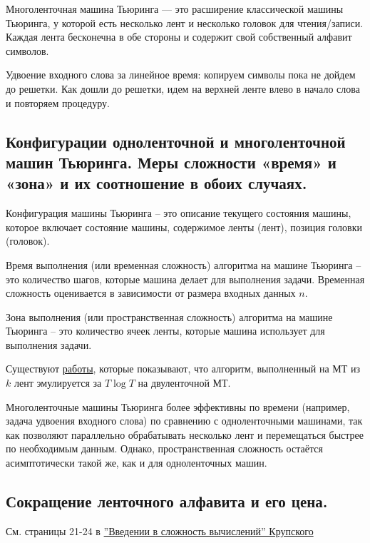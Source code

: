 \documentclass[a4paper, 10pt]{article}
\begin{document}
Многоленточная машина Тьюринга — это расширение классической машины Тьюринга, у которой есть несколько лент и несколько головок для чтения/записи. Каждая лента бесконечна в обе стороны и содержит свой собственный алфавит символов.

Удвоение входного слова за линейное время: копируем символы пока не дойдем до решетки. Как дошли до решетки, идем на верхней ленте влево в начало слова и повторяем процедуру.

\subsection{Конфигурации одноленточной и многоленточной машин Тьюринга. Меры сложности «время» и «зона» и их соотношение в обоих случаях.}

Конфигурация машины Тьюринга -- это описание текущего состояния машины, которое включает состояние машины, содержимое ленты (лент), позиция головки (головок).

Время выполнения (или временная сложность) алгоритма на машине Тьюринга -- это количество шагов, которые машина делает для выполнения задачи. Временная сложность оценивается в зависимости от размера входных данных $n$.

Зона выполнения (или пространственная сложность) алгоритма на машине Тьюринга -- это количество ячеек ленты, которые машина использует для выполнения задачи.

\hfill

Существуют \href{https://www.cs.bu.edu/faculty/gacs/courses/cs535/papers/HennieStearns66.pdf}{работы}, которые показывают, что алгоритм, выполненный на МТ из $k$ лент эмулируется за $T\log T$ на двуленточной МТ.

Многоленточные машины Тьюринга более эффективны по времени (например, задача удвоения входного слова) по сравнению с одноленточными машинами, так как позволяют параллельно обрабатывать несколько лент и перемещаться быстрее по необходимым данным. Однако, пространственная сложность остаётся асимптотически такой же, как и для одноленточных машин.

\subsection{Сокращение ленточного алфавита и его цена.}

См. страницы 21-24 в \href{https://static42.fileskachat.com/download/6/c/33377_672968aac1311878215538743df4fbd9.pdf}{''Введении в сложность вычислений'' Крупского}
\end{document}
